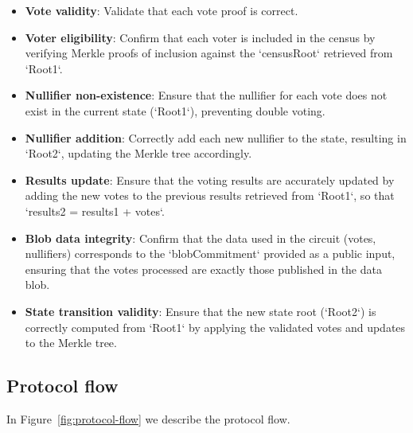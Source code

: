 \begin{mdframed}
\begin{minipage}[H]{1\textwidth}
\begin{spacing}{1.25}
\begin{itemize}
				\item \textbf{Vote validity}: Validate that each vote proof is correct.
				\item \textbf{Voter eligibility}: Confirm that each voter is included in the census by verifying Merkle proofs of inclusion against the `censusRoot` retrieved from `Root1`.
				\item \textbf{Nullifier non-existence}: Ensure that the nullifier for each vote does not exist in the current state (`Root1`), preventing double voting.
				\item \textbf{Nullifier addition}: Correctly add each new nullifier to the state, resulting in `Root2`, updating the Merkle tree accordingly.
				\item \textbf{Results update}: Ensure that the voting results are accurately updated by adding the new votes to the previous results retrieved from `Root1`, so that `results2 = results1 + votes`.
				\item \textbf{Blob data integrity}: Confirm that the data used in the circuit (votes, nullifiers) corresponds to the `blobCommitment` provided as a public input, ensuring that the votes processed are exactly those published in the data blob.
				\item \textbf{State transition validity}: Ensure that the new state root (`Root2`) is correctly computed from `Root1` by applying the validated votes and updates to the Merkle tree.
			\end{itemize}
			\vspace{-0.3cm}
		\end{spacing}
	\end{minipage}
\end{mdframed}


\subsection{Protocol flow}
\label{sec:vocdoni-protocol:flow}

In Figure~\ref{fig:protocol-flow} we describe the protocol flow.


